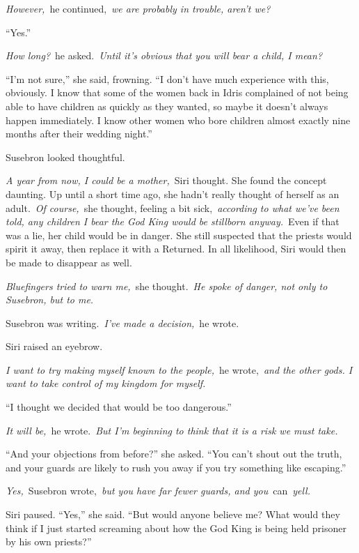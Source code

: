 \textit{However,}~he continued,~\textit{we are probably in trouble, aren’t we?}

“Yes.”

\textit{How long?}~he asked.~\textit{Until it’s obvious that you will bear a child, I mean?}

“I’m not sure,” she said, frowning. “I don’t have much experience with this, obviously. I know that some of the women back in Idris complained of not being able to have children as quickly as they wanted, so maybe it doesn’t always happen immediately. I know other women who bore children almost exactly nine months after their wedding night.”

Susebron looked thoughtful.

\textit{A year from now, I could be a mother,}~Siri thought. She found the concept daunting. Up until a short time ago, she hadn’t really thought of herself as an adult.~\textit{Of course,}~she thought, feeling a bit sick,~\textit{according to what we’ve been told, any children I bear the God King would be stillborn anyway.}~Even if that was a lie, her child would be in danger. She still suspected that the priests would spirit it away, then replace it with a Returned. In all likelihood, Siri would then be made to disappear as well.

\textit{Bluefingers tried to warn me,}~she thought.~\textit{He spoke of danger, not only to Susebron, but to me.}

Susebron was writing.~\textit{I’ve made a decision,}~he wrote.

Siri raised an eyebrow.

\textit{I want to try making myself known to the people,}~he wrote,~\textit{and the other gods. I want to take control of my kingdom for myself.}

“I thought we decided that would be too dangerous.”

\textit{It will be,}~he wrote.~\textit{But I’m beginning to think that it is a risk we must take.}

“And your objections from before?” she asked. “You can’t shout out the truth, and your guards are likely to rush you away if you try something like escaping.”

\textit{Yes,}~Susebron wrote,~\textit{but you have far fewer guards, and you}~can~\textit{yell.}

Siri paused. “Yes,” she said. “But would anyone believe me? What would they think if I just started screaming about how the God King is being held prisoner by his own priests?”


